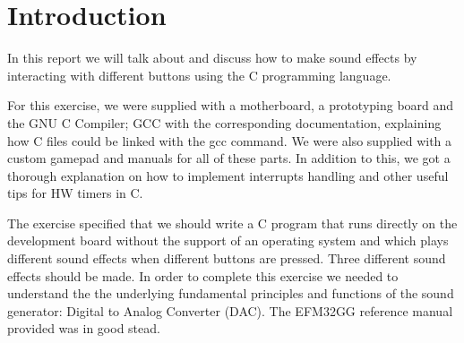 \chapter{Introduction}

In this report we will talk about and discuss how to make sound effects by interacting with different buttons using the C programming language. 

For this exercise, we were supplied with a motherboard, a prototyping board and the GNU C Compiler; GCC with the corresponding documentation, explaining how C files could be linked with the gcc command.  We were also supplied with a custom gamepad and manuals for all of these parts. In addition to this, we got a thorough explanation on how to implement interrupts handling and other useful tips for HW timers in C. 

The exercise specified that we should write a C program that runs directly on the development board without the support of an operating system and which plays different sound effects when different buttons are pressed. Three different sound effects should be made. In order to complete this exercise we needed to understand the the underlying fundamental principles and functions of the sound generator: Digital to Analog Converter (DAC). The EFM32GG reference manual provided was in good stead.